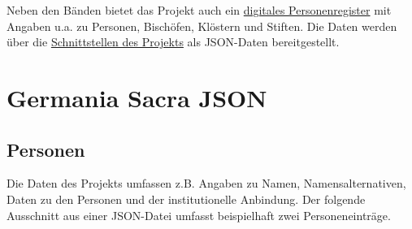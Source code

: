\documentclass[ngerman,]{scrreprt}
\begin{document}
Neben den Bänden bietet das Projekt auch ein \href{https://adw-goe.de/forschung/forschungsprojekte-akademienprogramm/germania-sacra/digitales-personenregister/}{digitales Personenregister} mit Angaben u.a. zu Personen, Bischöfen, Klöstern und Stiften. Die Daten werden über die \href{https://adw-goe.de/forschung/forschungsprojekte-akademienprogramm/germania-sacra/schnittstellen-und-linked-data/}{Schnittstellen des Projekts} als JSON-Daten bereitgestellt.

\section{Germania Sacra JSON}\label{germania-sacra-json}

\subsection{Personen}\label{personen}

Die Daten des Projekts umfassen z.B. Angaben zu Namen, Namensalternativen, Daten zu den Personen und der institutionelle Anbindung. Der folgende Ausschnitt aus einer JSON-Datei umfasst beispielhaft zwei Personeneinträge.
\end{document}
